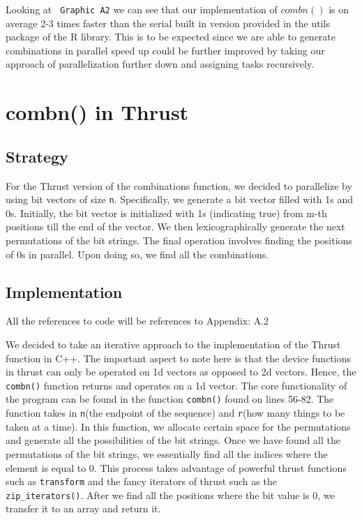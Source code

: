 \documentclass[titlepage, 11pt]{article}
\begin{document}
Looking at \verb; Graphic A2; we can see that our implementation of $combn()$ is on average 2-3 times faster than the serial built in version provided in the utils package of the R library. This is to be expected since we are able to generate combinations in parallel speed up could be further improved by taking our approach of parallelization further down and assigning tasks recursively.

\section{combn() in Thrust}

\subsection{Strategy}
For the Thrust version of the combinations function, we decided to parallelize by using bit vectors of size \verb|n|. Specifically, we generate a bit vector filled with 1s and 0s. Initially, the bit vector is initialized  with 1s (indicating true) from m-th positions till the end of the vector. We then lexicographically generate the next permutations of the bit strings. The final operation involves finding the positions of 0s in parallel. Upon doing so, we find all the combinations.

\subsection{Implementation}

\begin{center}\textcolor{black!50}{All the references to code will be references to Appendix: A.2}\\ \end{center}

We decided to take an iterative approach to the implementation of the Thrust function in C++. The important aspect to note here is that the device functions in thrust can only be operated on 1d vectors as opposed to 2d vectors. Hence, the \verb|combn()| function returns and operates on a 1d vector. The core functionality of the program can be found in the function \verb|combn()| found on lines 56-82. The function takes in \verb|n|(the endpoint of the sequence) and \verb|r|(how many things to be taken at a time). In this function, we allocate certain space for the permutations and generate all the possibilities of the bit strings. Once we have found all the permutations of the bit strings, we essentially find all the indices where the element is equal to 0. This process takes advantage of powerful thrust functions such as \verb|transform| and the fancy iterators of thrust such as the \verb|zip_iterators()|. After we find all the positions where the bit value is 0, we transfer it to an array and return it. 
\end{document}

